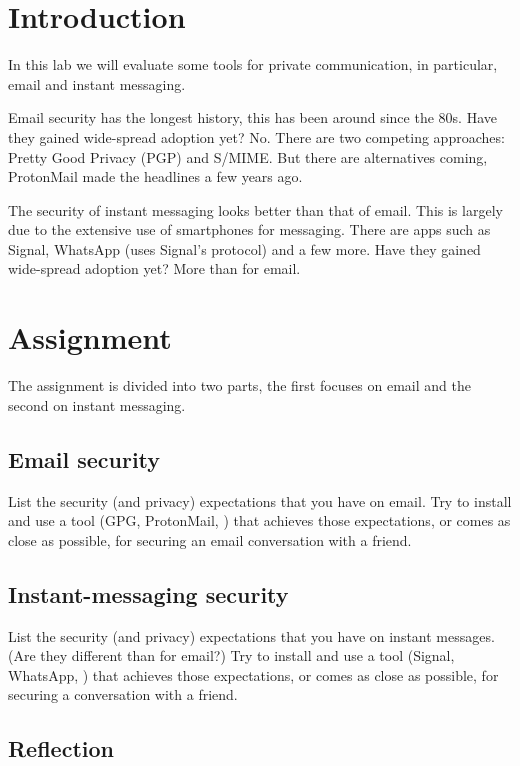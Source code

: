 \mode*

\section{Introduction}%
\label{Introduction}

In this lab we will evaluate some tools for private communication, in 
particular, email and instant messaging.

Email security has the longest history, this has been around since the 80s.
Have they gained wide-spread adoption yet?
No.
There are two competing approaches: Pretty Good Privacy (PGP) and S/MIME.
But there are alternatives coming, \eg ProtonMail made the headlines a few 
years ago.

The security of instant messaging looks better than that of email.
This is largely due to the extensive use of smartphones for messaging.
There are apps such as Signal, WhatsApp (uses Signal's protocol) and a few 
more.
Have they gained wide-spread adoption yet?
More than for email.


\section{Assignment}%
\label{sec:Tasks}

The assignment is divided into two parts, the first focuses on email and the 
second on instant messaging.

\subsection{Email security}

List the security (and privacy) expectations that you have on email.
Try to install and use a tool (\eg GPG, ProtonMail, \etc) that achieves those 
expectations, or comes as close as possible, for securing an email conversation 
with a friend.

\subsection{Instant-messaging security}

List the security (and privacy) expectations that you have on instant messages.
(Are they different than for email?)
Try to install and use a tool (\eg Signal, WhatsApp, \etc) that achieves those 
expectations, or comes as close as possible, for securing a conversation with a 
friend.

\subsection{Reflection}

